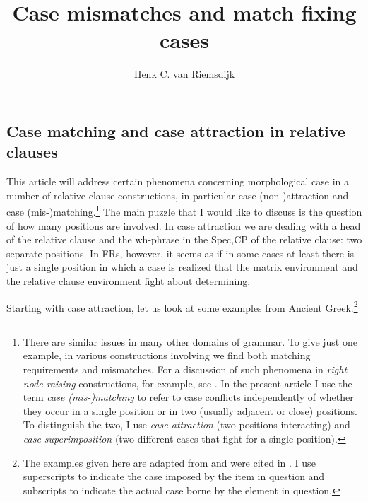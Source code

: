 \documentclass[output=paper]{langsci/langscibook}
\author{Henk C. van Riemsdijk\affiliation{Tilburg University}}
\title{Case mismatches and match fixing cases}
\begin{document}
\glsresetall
\maketitle
\begin{refcontext}

\section{Case matching and case attraction in relative clauses}

This article will address certain phenomena concerning
    morphological case in a number of relative clause constructions, in
    particular case (non-)attraction and case (mis-)matching.\footnote{There
        are similar issues in many other domains of grammar. To give just one
        example, in various constructions involving  we find both
        matching requirements and mismatches. For a discussion of such
        phenomena in \textit{right node raising} constructions, for example, see
        \citet{Larson2012}. In the present article I use the term \emph{case
        (mis-)matching} to refer to case conflicts independently of whether
        they occur in a single position or in two (usually adjacent or close)
        positions. To distinguish the two, I use \emph{case attraction} (two
    positions interacting) and \emph{case superimposition} (two different cases
that fight for a single position).} The main puzzle that I would like to
discuss is the question of how many positions are involved. In case attraction
we are dealing with a head of the relative clause and the wh-phrase in the
Spec,CP of the relative clause: two separate positions. In \glspl{FR}, however,
it seems as if in some cases at least there is just a single position in which
a case is realized that the matrix environment and the relative clause
environment fight about determining.

\begin{sloppypar}Starting with case attraction, let us look at some examples from Ancient
Greek.\footnote{The examples given here are adapted from
    \textcite{Hirschbuhler1976} and were cited in
    \citet{GroosVanRiemsdijk1981}. I use superscripts to indicate the case
    imposed by the item in question and subscripts to indicate the actual case
borne by the element in question.}\end{sloppypar}


\end{refcontext}
\end{document}
